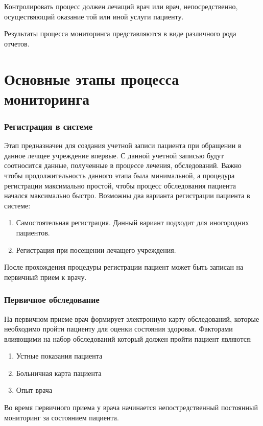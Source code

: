 Контролировать процесс должен лечащий врач или врач, непосредственно, осуществяющий оказание той или иной услуги пациенту.

Результаты процесса мониторинга представляются в виде различного рода отчетов.

\section{Основные этапы процесса мониторинга}

\subsubsection{Регистрация в системе}

Этап предназначен для создания учетной записи пациента при обращении в данное
лечщее учреждение впервые. С данной учетной записью будут соотносится данные,
полученные в процессе лечения, обследований. Важно чтобы продолжительность
данного этапа была минимальной, а процедура регистрации максимально простой,
чтобы процесс обследования пациента начался максимально быстро.
Возможны два варианта регистрации пациента в системе:

\begin{enumerate}
  \item Самостоятельная регистрация. Данный вариант подходит для иногородних
  пациентов.
  \item Регистрация при посещении лечащего учреждения.
\end{enumerate}

После прохождения процедуры регистрации пациент может быть записан на первичный
прием к врачу.

\subsubsection{Первичное обследование}

На первичном приеме врач формирует электронную карту обследований, которые
необходимо пройти пациенту для оценки состояния здоровья. Факторами влияющими на
набор обследований который должен пройти пациент являются:
\begin{enumerate}
  \item Устные показания пациента
  \item Больничная карта пациента
  \item Опыт врача   
\end{enumerate}

Во время первичного приема у врача начинается непостредственный постоянный
мониторинг за состоянием пациента.

